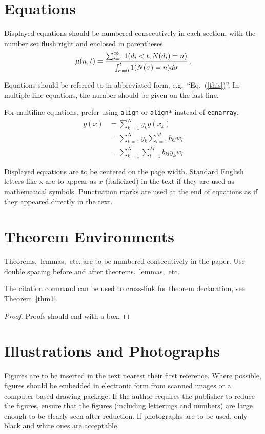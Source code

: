 \documentclass{ws-jbcb}
\begin{document}
\section{Equations}
Displayed equations should be numbered consecutively in each
section, with the number set flush right and enclosed in
parentheses
\begin{equation}
\mu(n, t) = {\sum^\infty_{i=1} 1(d_i < t, N(d_i) = n) \over
\int^t_{\sigma=0} 1(N(\sigma) = n)d\sigma}\,.
\label{this}
\end{equation}

Equations should be referred to in abbreviated form,
e.g.~``Eq.~(\ref{this})''. In multiple-line
equations, the number should be given on the last line.

For multiline equations, prefer using \verb|align| or \verb|align*| instead of \verb|eqnarray|.
\begin{align}
g(x) & = \sum_{k=1}^{N} y_k g(x_k) \nonumber\\
& = \sum_{k=1}^{N} y_k \sum_{l=1}^{M} b_{kl} w_l \nonumber\\
& = \sum_{k=1}^{N} \sum_{l=1}^{M} b_{kl} y_k w_l
\end{align}

Displayed equations are to be centered on the page width.
Standard English letters like x are to appear as $x$
(italicized) in the text if they are used as mathematical
symbols. Punctuation marks are used at the end of equations as
if they appeared directly in the text.

\section{Theorem Environments}

\begin{theorem}
\label{thm1}
Theorems$,$ lemmas$,$ etc. are to be numbered consecutively in the
paper. Use double spacing before and after theorems$,$ lemmas$,$ etc.
\end{theorem}

The citation command can be used to cross-link for theorem
declaration, see Theorem~\ref{thm1}.

\begin{proof}
Proofs should end with a box.
\end{proof}

\vspace{-16pt}
\section{Illustrations and Photographs}
Figures are to be inserted in the text nearest their first reference.
Where possible, figures should be embedded in electronic form from
scanned images or a computer-based drawing package. If the author requires the
publisher to reduce the figures, ensure that the figures (including
letterings and numbers) are large enough to be clearly seen after
reduction. If photographs are to be used, only black and white ones
are acceptable.
\end{document}
